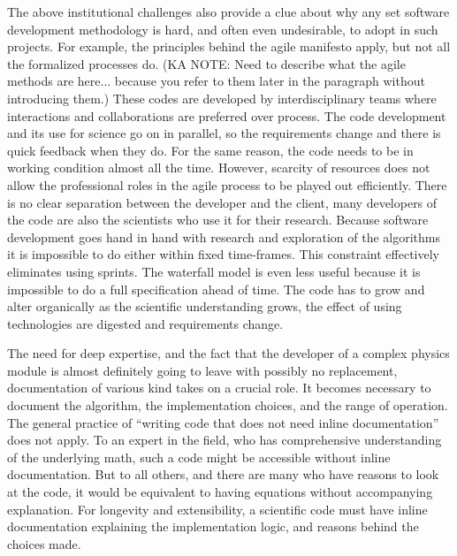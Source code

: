 The above institutional challenges also provide a clue about why any
set software development methodology is hard, and often even
undesirable, to adopt in such projects. For example, the principles
behind the agile manifesto apply, but not all the formalized processes
do.  (KA NOTE: Need to describe what the agile methods are here... because you refer to them later in the paragraph without introducing them.)
These codes are developed by interdisciplinary teams where
interactions and collaborations are preferred over process. The code
development and its use for science go on in parallel, so the
requirements change and there is quick feedback when they do.  For the
same reason, the code needs to be in working condition almost all the
time. However, scarcity of resources does not allow the professional roles in
the agile process to be played out efficiently.  There is no clear
separation between the developer and the client, many developers of
the code are also the scientists who use it for their research. 
Because software development goes hand in hand with research and
exploration of the algorithms it is impossible to do either within
fixed time-frames. This constraint effectively eliminates using
sprints.  The waterfall model is even less useful because it is
impossible to do a full specification ahead of time. The code has to
grow and alter organically as the scientific understanding grows, the
effect of using technologies are digested and requirements change.

The need for deep expertise, and the fact that the developer of a
complex physics module is almost definitely going to leave with
possibly no replacement, documentation of various kind takes on a
crucial role. It becomes necessary to document the algorithm, the
implementation choices, and the range of operation. The general
practice of ``writing code that does not need inline documentation''
does not apply. To an expert in the field, who has comprehensive
understanding of the underlying math, such a code might be accessible
without inline documentation. But to all others, and there are many
who have reasons to look at the code, it would be equivalent to having
equations without accompanying explanation. For longevity and
extensibility, a scientific code must have inline documentation
explaining the implementation logic, and reasons behind the
choices made.   

